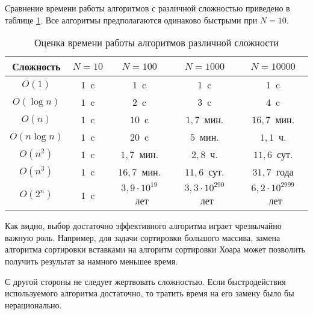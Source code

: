 Сравнение времени работы алгоритмов с различной сложностью приведено в
таблице \ref{tbl:complexity}. Все алгоритмы предполагаются одинаково
быстрыми при $N=10$.

\begin{table}
  \begin{centering}
    \begin{tabular}{|c|c|c|c|c|}
      \hline 
      Сложность    & $N=10$ & $N=100$                 & $N=1000$                 & $N=10000$\\
      \hline 
      \hline 
      $O(1)$       & $1$~c  & $1$~c                   & $1$~c                    & $1$~c\\
      \hline 
      $O(\log n)$  & $1$~c  & $2$~c                   & $3$~c                    & $4$~c\\
      \hline 
      $O(n)$       & $1$~c  & $10$~c                  & $1{,}7$~мин.             & $16{,}7$~мин.\\
      \hline 
      $O(n\log n)$ & $1$~c  & $20$~c                  & $5$~мин.                 & $1{,}1$~ч.\\
      \hline 
      $O(n^{2})$   & $1$~c  & $1{,}7$~мин.            & $2{,}8$~ч.               & $11{,}6$~сут.\\
      \hline 
      $O(n^{3})$   & $1$~c  & $16{,}7$~мин.           & $11{,}6$~сут.            & $31{,}7$~года\\
      \hline 
      $O(2^{n})$   & $1$~c  & $3{,}9\cdot10^{19}$~лет & $3{,}3\cdot10^{290}$~лет & $6{,}2\cdot10^{2999}$~лет\\
      \hline 
    \end{tabular}
    \par
  \end{centering}
    
  \caption{Оценка времени работы алгоритмов различной сложности}
  \label{tbl:complexity}
\end{table}

Как видно, выбор достаточно эффективного алгоритма играет чрезвычайно
важную роль. Например, для задачи сортировки большого массива, замена
алгоритма сортировки вставками на алгоритм сортировки Хоара может
позволить получить результат за намного меньшее время.

С другой стороны не следует жертвовать сложностью. Если быстродействия
используемого алгоритма достаточно, то тратить время на его замену
было бы нерационально.
